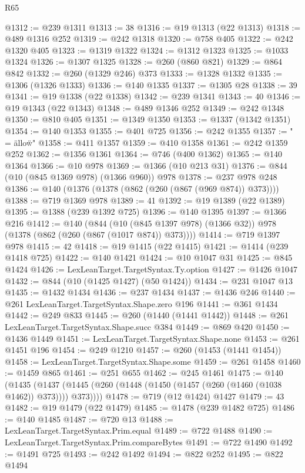 \begin{lexlean}{R65}
\begin{coremodule}
@1312 := @239 @1311
@1313 := 38
@1316 := @19 @1313 (@22 @1313)
@1318 := @489 @1316 @252
@1319 := @242 @1318
@1320 := @758 @405
@1322 := @242 @1320 @405
@1323 := @1319 @1322
@1324 := @1312 @1323
@1325 := @1033 @1324
@1326 := @1307 @1325
@1328 := @260 (@860 @821)
@1329 := @864 @842
@1332 := @260 (@1329 @246) @373
@1333 := @1328 @1332
@1335 := @1306 (@1326 @1333)
@1336 := @140 @1335
@1337 := @1305 @28
@1338 := 39
@1341 := @19 @1338 (@22 @1338)
@1342 := @239 @1341
@1343 := 40
@1346 := @19 @1343 (@22 @1343)
@1348 := @489 @1346 @252
@1349 := @242 @1348
@1350 := @810 @405
@1351 := @1349 @1350
@1353 := @1337 (@1342 @1351)
@1354 := @140 @1353
@1355 := @401 @725
@1356 := @242 @1355
@1357 := " = \"allow\"\n"
@1358 := @411 @1357
@1359 := @410 @1358
@1361 := @242 @1359 @252
@1362 := @1356 @1361
@1364 := @746 (@400 @1362)
@1365 := @140 @1364
@1366 := @10 @978
@1369 := @1366 (@10 @213 @31)
@1376 := @844 (@10 (@845 @1369 @978) (@1366 @960)) @978
@1378 := @237 @978 @248
@1386 := @140 (@1376 (@1378 (@862 (@260 (@867 (@969 @874)) @373))))
@1388 := @719 @1369 @978
@1389 := 41
@1392 := @19 @1389 (@22 @1389)
@1395 := @1388 (@239 @1392 @725)
@1396 := @140 @1395
@1397 := @1366 @216
@1412 := @140
    (@844 (@10 (@845 @1397 @978) (@1366 @32)) @978 (@1378 (@862 (@260 (@867 (@1017 @874)) @373))))
@1414 := @719 @1397 @978
@1415 := 42
@1418 := @19 @1415 (@22 @1415)
@1421 := @1414 (@239 @1418 @725)
@1422 := @140 @1421
@1424 := @10 @1047 @31
@1425 := @845 @1424
@1426 := LexLeanTarget.TargetSyntax.Ty.option
@1427 := @1426 @1047
@1432 := @844 (@10 (@1425 @1427) (@50 @1424))
@1434 := @231 @1047 @13
@1435 := @1432 @1434
@1436 := @237 @1434
@1437 := @1436 @246
@1440 := @261 LexLeanTarget.TargetSyntax.Shape.zero @196
@1441 := @361 @1434
@1442 := @249 @833
@1445 := @260 (@1440 (@1441 @1442))
@1448 := @261 LexLeanTarget.TargetSyntax.Shape.succ @384
@1449 := @869 @420
@1450 := @1436 @1449
@1451 := LexLeanTarget.TargetSyntax.Shape.none
@1453 := @261 @1451 @196
@1454 := @249 @1210
@1457 := @260 (@1453 (@1441 @1454))
@1458 := LexLeanTarget.TargetSyntax.Shape.some
@1459 := @261 @1458
@1460 := @1459 @865
@1461 := @251 @655
@1462 := @245 @1461
@1475 := @140
    (@1435 (@1437 (@1445 (@260 (@1448 (@1450 (@1457 (@260 (@1460 (@1038 @1462)) @373)))) @373))))
@1478 := @719 (@12 @1424) @1427
@1479 := 43
@1482 := @19 @1479 (@22 @1479)
@1485 := @1478 (@239 @1482 @725)
@1486 := @140 @1485
@1487 := @720 @13
@1488 := LexLeanTarget.TargetSyntax.Prim.equal
@1489 := @722 @1488
@1490 := LexLeanTarget.TargetSyntax.Prim.compareBytes
@1491 := @722 @1490
@1492 := @1491 @725
@1493 := @242 @1492
@1494 := @822 @252
@1495 := @822 @1494

\end{coremodule}
\end{lexlean}
